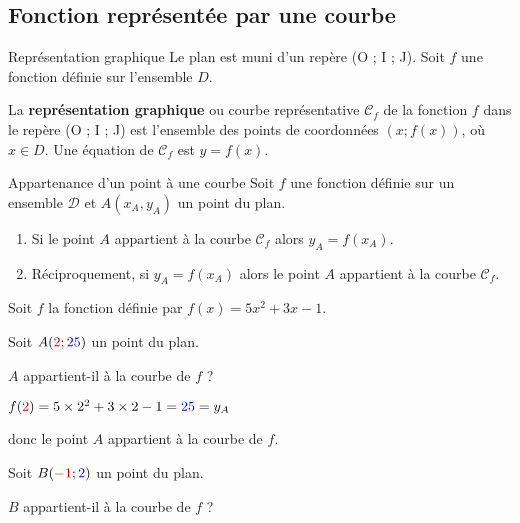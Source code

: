 \begin{pageCours} %


\subsection{Fonction représentée par une courbe}


\begin{DefT}{Représentation graphique}
Le plan est muni d'un repère (O ; I ; J). Soit $f$ une fonction définie sur l'ensemble $D$.

La \textbf{représentation graphique} ou courbe représentative $\mathscr{C}_f$ de la fonction $f$ dans le repère (O ; I ; J) est l'ensemble des points de coordonnées $(x ; f (x))$, où $x \in D$. Une équation de $\mathscr{C}_f$ est $y=f(x)$.
\end{DefT}

\begin{PpT}{Appartenance d'un point à une courbe}
Soit $f$ une fonction définie sur un ensemble $\mathcal{D}$ et $A(x_A,y_A)$ un point du plan.
\begin{enumerate}
\item Si le point $A$ appartient à la courbe $\mathscr{C}_f$ alors $y_A=f(x_A)$.
\item Réciproquement, si $y_A=f(x_A)$ alors le point $A$ appartient à la courbe $\mathscr{C}_f$. 
\end{enumerate}
\end{PpT}

\begin{Ex} 

Soit $f$ la fonction définie par $f(x)=5x^2+3x-1$.

\begin{minipage}{0.5\linewidth} 
Soit $A({\color{red}2};{\color{blue}25})$ un point du plan. 

$A$ appartient-il à la courbe de $f$ ?

$f({\color{red}2})=5\times 2^2+3\times 2-1={\color{blue}25}=y_A$ 

donc le point $A$ appartient à la courbe de $f$.  
\end{minipage}
\begin{minipage}{0.5\linewidth} 
Soit $B({\color{red}-1};{\color{blue}2})$ un point du plan.  

$B$ appartient-il à la courbe de $f$ ?


\end{minipage}
\end{Ex}
\end{pageCours}
